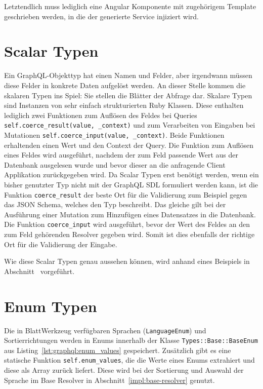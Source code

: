 Letztendlich muss lediglich eine Angular Komponente mit zugehörigem Template geschrieben werden, in die der generierte Service injiziert wird.

\section{Scalar Typen}
\label{graphql:scalartypes}
Ein GraphQL-Objekttyp hat einen Namen und Felder, aber irgendwann müssen diese Felder in konkrete Daten aufgelöst werden. An dieser Stelle kommen die skalaren Typen ins Spiel: Sie stellen die Blätter der Abfrage dar. 
Skalare Typen sind Instanzen von sehr einfach strukturierten Ruby Klassen. Diese enthalten lediglich zwei Funktionen zum Auflösen des Feldes bei Queries \texttt{self.coerce\_result(value, \_context)} und zum Verarbeiten von Eingaben bei Mutationen \texttt{self.coerce\_input(\-value, \_context)}. Beide Funktionen erhaltenden einen Wert und den Context der Query. Die Funktion zum Auflösen eines Feldes wird ausgeführt, nachdem der zum Feld passende Wert aus der Datenbank ausgelesen wurde und bevor dieser an die anfragende Client Applikation zurückgegeben wird. Da Scalar Typen erst benötigt werden, wenn ein bisher genutzter Typ nicht mit der GraphQL SDL formuliert werden kann, ist die Funktion \texttt{coerce\_result} der beste Ort für die Validierung zum Beispiel gegen das JSON Schema, welches den Typ beschreibt. Das gleiche gilt bei der Ausführung einer Mutation zum Hinzufügen eines Datensatzes in die Datenbank. Die Funktion \texttt{coerce\_input} wird ausgeführt, bevor der Wert des Feldes an den zum Feld gehörenden Resolver gegeben wird. Somit ist dies ebenfalls der richtige Ort für die Validierung der Eingabe.

Wie diese Scalar Typen genau aussehen können, wird anhand eines Beispiels in Abschnitt~ vorgeführt.

\section{Enum Typen}
\label{graphql:enumtypes}
Die in BlattWerkzeug verfügbaren Sprachen (\texttt{LanguageEnum}) und Sortierrichtungen werden in Enums innerhalb der Klasse \texttt{Types::Base::BaseEnum} aus Listing~\ref{lst:graphql:enum_values} gespeichert. Zusätzlich gibt es eine statische Funktion \texttt{self.enum\_values}, die die Werte eines Enums extrahiert und diese als Array zurück liefert. Diese wird bei der Sortierung und Auswahl der Sprache im Base Resolver in Abschnitt~\ref{impl:base-resolver} genutzt.

